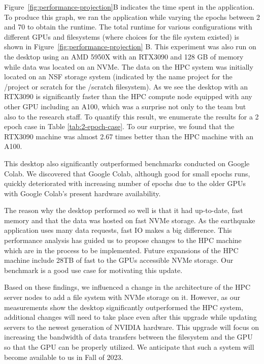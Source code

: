 \documentclass[utf8]{FrontiersinVancouver} %
\begin{document}
Figure~\ref{fig:performance-projection}B indicates the time spent in the application.  To produce this graph, we ran the application  while varying the epochs between 2 and 70 to obtain the
runtime.  The total runtime for various configurations with different GPUs and filesystems (where choices for the file system existed) is shown in
Figure~\ref{fig:performance-projection} B. 
This experiment was also
run on the desktop using an AMD 5950X with an RTX3090 and 128 GB of
memory while data was located on an NVMe.  The data on the HPC system
was initially located on an NSF storage system (indicated by the name project for the /project or scratch for the /scratch filesystem).  As we see the desktop with an RTX3090 is significantly faster than the HPC compute node
equipped with any other GPU including an A100, which was a surprise not only to the team but also to the research staff.  To quantify this result, we enumerate the
results for a 2 epoch case in Table \ref{tab:2-epoch-case}.  To our
surprise, we found that the RTX3090 machine was almost 2.67 times
better than the HPC machine with an A100.

This desktop also significantly outperformed benchmarks conducted on Google Colab. We discovered that Google Colab, although
good for small epochs runs, quickly deteriorated with increasing
number of epochs due to the older GPUs with Google Colab's present hardware availability.

The reason why the desktop performed so well is that it had up-to-date,
fast memory and that the data was hosted on fast NVMe storage. As the
earthquake application uses many data requests, fast IO makes a big
difference. This performance analysis has guided us to propose changes to the HPC
machine which are in the process to be implemented. Future expansions of the HPC machine include 28TB of fast to
the GPUs accessible NVMe storage. Our benchmark is a good use case for motivating this update.

Based on these findings, we influenced a change in the architecture of the HPC server nodes to add a file system with NVMe storage on it. However, as our measurements show the desktop significantly outperformed the HPC system, additional changes will need to take place even after this upgrade while updating servers to the newest generation of NVIDIA hardware. This upgrade will focus on increasing the bandwidth of data transfers between the filesystem and the GPU so that the GPU can be properly utilized. We anticipate that such a system will become available to us in Fall of 2023.
\end{document}
